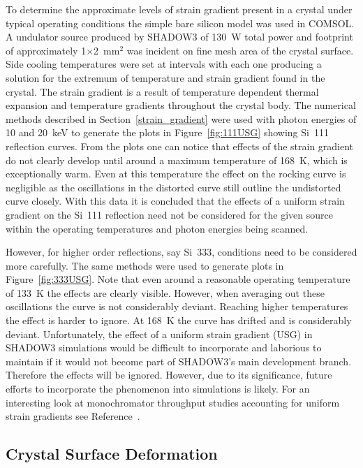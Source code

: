 \documentclass[preprint]{iucr}              %
\begin{document}
To determine the approximate levels of strain gradient present in a crystal under typical operating conditions the simple bare silicon model was used in COMSOL. A undulator source produced by SHADOW3 of 130~W total power and footprint of approximately 1$\times$2~mm$^2$ was incident on fine mesh area of the crystal surface. Side cooling temperatures were set at intervals with each one producing a solution for the extremum of temperature and strain gradient found in the crystal. The strain gradient is a result of temperature dependent thermal expansion and temperature gradients throughout the crystal body. The numerical methods described in Section~\ref{strain_gradient} were used with photon energies of 10 and 20~keV to generate the plots in Figure~\ref{fig:111USG} showing Si~111 reflection curves. From the plots one can notice that effects of the strain gradient do not clearly develop until around a maximum temperature of 168~K, which is exceptionally warm. Even at this temperature the effect on the rocking curve is negligible as the oscillations in the distorted curve still outline the undistorted curve closely. With this data it is concluded that the effects of a uniform strain gradient on the Si~111 reflection need not be considered for the given source within the operating temperatures and photon energies being scanned.

However,  for higher order reflections, say Si~333, conditions need to be considered more carefully. The same methods were used to generate plots in Figure~\ref{fig:333USG}. Note that even around a reasonable operating temperature of 133~K the effects are clearly visible. However, when averaging out these oscillations the curve is not considerably deviant. Reaching higher temperatures the effect is harder to ignore. At 168~K the curve has drifted and is considerably deviant. Unfortunately, the effect of a uniform strain gradient (USG) in SHADOW3 simulations would be difficult to incorporate and laborious to maintain if it would not become part of SHADOW3's main development branch. Therefore the effects will be ignored. However, due to its significance, future efforts to incorporate the phenomenon into simulations is likely. For an interesting look at monochromator throughput studies accounting for uniform strain gradients see Reference~\cite{mocellaUSG}.

\subsection{Crystal Surface Deformation}\label{deformation}
\end{document}
